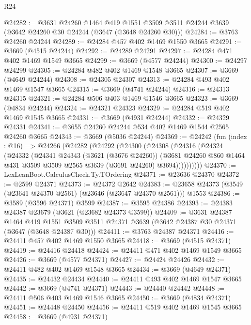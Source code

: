 \begin{lexlean}{R24}
\begin{coremodule}
@24282 := @3631
    @24260
    @1464
    @419
    @1551
    @3509
    @3511
    @24244
    @3639
    (@3642 @24260 @30 @24244 (@3647 (@3648 @24260 @30)))
@24284 := @3763 @24260 @24244
@24289 := @24284 @457 @402 @1469 @1550 @3665
@24291 := @3669 (@4515 @24244)
@24292 := @24289 @24291
@24297 := @24284 @471 @402 @1469 @1549 @3665
@24299 := @3669 (@4577 @24244)
@24300 := @24297 @24299
@24305 := @24284 @482 @402 @1469 @1548 @3665
@24307 := @3669 (@4649 @24244)
@24308 := @24305 @24307
@24313 := @24284 @493 @402 @1469 @1547 @3665
@24315 := @3669 (@4741 @24244)
@24316 := @24313 @24315
@24321 := @24284 @506 @403 @1469 @1546 @3665
@24323 := @3669 (@4834 @24244)
@24324 := @24321 @24323
@24329 := @24284 @519 @402 @1469 @1545 @3665
@24331 := @3669 (@4931 @24244)
@24332 := @24329 @24331
@24341 := @3655 @24260 @24244 @534 @402 @1469 @1544 @2565 @24260 @3665
@24343 := @3669 (@5036 @24244)
@24369 := @24242
    (fun (index : @16) =>
    @24266
      (@24282
        (@24292
          (@24300
            (@24308
              (@24316
                (@24324
                  (@24332
                    (@24341
                      @24343
                      (@3621 (@3676 @24260))
                      (@3681
                        @24260
                        @860
                        @1464
                        @431
                        @3509
                        @3509
                        @2565
                        @3639
                        (@3691 @24260)
                        @3694))))))))))
@24370 := LexLeanBoot.CalculusCheck.Ty.TOrdering
@24371 := @23636 @24370
@24372 := @2599 @24371
@24373 := @24372 @2642
@24383 := @23658 @24373 (@3549 (@23641 @24370 @2561) (@23646 (@23647 @24370 @2561))) @1553
@24386 := @3589 (@3596 @24371) @3599
@24387 := @3595 @24386
@24393 := @24383 @24387 @23679 (@3621 (@23682 @24373 @3599))
@24409 := @3631
    @24387
    @1464
    @419
    @1551
    @3509
    @3511
    @24371
    @3639
    (@3642 @24387 @30 @24371 (@3647 (@3648 @24387 @30)))
@24411 := @3763 @24387 @24371
@24416 := @24411 @457 @402 @1469 @1550 @3665
@24418 := @3669 (@4515 @24371)
@24419 := @24416 @24418
@24424 := @24411 @471 @402 @1469 @1549 @3665
@24426 := @3669 (@4577 @24371)
@24427 := @24424 @24426
@24432 := @24411 @482 @402 @1469 @1548 @3665
@24434 := @3669 (@4649 @24371)
@24435 := @24432 @24434
@24440 := @24411 @493 @402 @1469 @1547 @3665
@24442 := @3669 (@4741 @24371)
@24443 := @24440 @24442
@24448 := @24411 @506 @403 @1469 @1546 @3665
@24450 := @3669 (@4834 @24371)
@24451 := @24448 @24450
@24456 := @24411 @519 @402 @1469 @1545 @3665
@24458 := @3669 (@4931 @24371)

\end{coremodule}
\end{lexlean}
